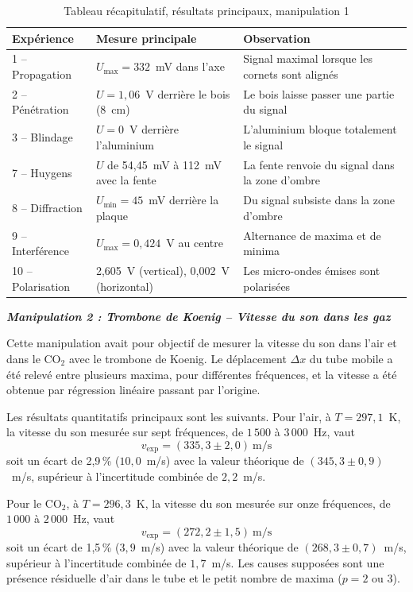 \begin{table}[H]
    \centering
    \begin{tabular}{l p{4.6cm} p{5.6cm}}
        \toprule
        Expérience & Mesure principale & Observation \\
        \midrule
        1 -- Propagation & $U_{\max} = 332$~mV dans l'axe & Signal maximal lorsque les cornets sont alignés \\
        2 -- Pénétration & $U = 1{,}06$~V derrière le bois (8~cm) & Le bois laisse passer une partie du signal \\
        3 -- Blindage & $U = 0$~V derrière l'aluminium & L'aluminium bloque totalement le signal \\
        7 -- Huygens & $U$ de 54,45~mV à 112~mV avec la fente & La fente renvoie du signal dans la zone d'ombre \\
        8 -- Diffraction & $U_{\min} = 45$~mV derrière la plaque & Du signal subsiste dans la zone d'ombre \\
        9 -- Interférence & $U_{\max} = 0{,}424$~V au centre & Alternance de maxima et de minima \\
        10 -- Polarisation & 2,605~V (vertical), 0,002~V (horizontal) & Les micro-ondes émises sont polarisées \\
        \bottomrule
    \end{tabular}
    \caption{Tableau récapitulatif, résultats principaux, manipulation 1}
    \label{tab:resume-qualitatif}
\end{table}

\medskip

\textbf{\textit{Manipulation 2 : Trombone de Koenig -- Vitesse du son dans les gaz}}

Cette manipulation avait pour objectif de mesurer la vitesse du son dans l'air et dans le CO$_2$ avec le trombone de Koenig. Le déplacement $\Delta x$ du tube mobile a été relevé entre plusieurs maxima, pour différentes fréquences, et la vitesse a été obtenue par régression linéaire passant par l'origine.

Les résultats quantitatifs principaux sont les suivants. Pour l'air, à $T = 297{,}1$~K, la vitesse du son mesurée sur sept fréquences, de $1\,500$ à $3\,000$~Hz, vaut
\[ v_{\text{exp}} = (335{,}3 \pm 2{,}0)~\text{m/s} \]
soit un écart de 2,9\,\% ($10{,}0$~m/s) avec la valeur théorique de $(345{,}3 \pm 0{,}9)$~m/s, supérieur à l'incertitude combinée de $2{,}2$~m/s.

Pour le CO$_2$, à $T = 296{,}3$~K, la vitesse du son mesurée sur onze fréquences, de $1\,000$ à $2\,000$~Hz, vaut
\[ v_{\text{exp}} = (272{,}2 \pm 1{,}5)~\text{m/s} \]
soit un écart de 1,5\,\% ($3{,}9$~m/s) avec la valeur théorique de $(268{,}3 \pm 0{,}7)$~m/s, supérieur à l'incertitude combinée de $1{,}7$~m/s. Les causes supposées sont une présence résiduelle d'air dans le tube et le petit nombre de maxima ($p = 2$ ou $3$).

